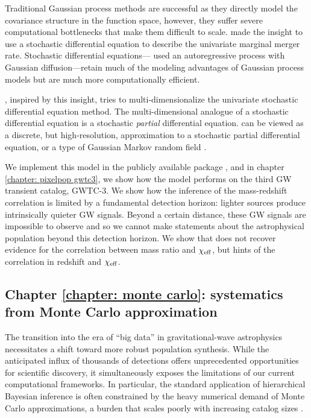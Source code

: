 \begin{refsection}
Traditional Gaussian process methods are successful as they directly model the covariance structure in the function space, however, they suffer severe computational bottlenecks that make them difficult to scale. \citet{Callister:2023tgi} made the insight to use a stochastic differential equation to describe the univariate marginal merger rate. Stochastic differential equations---\citet{Callister:2023tgi} used an autoregressive process with Gaussian diffusion---retain much of the modeling advantages of Gaussian process models but are much more computationally efficient. 

\PixelPop, inspired by this insight, tries to multi-dimensionalize the univariate stochastic differential equation method. The multi-dimensional analogue of a stochastic differential equation is a stochastic \textit{partial} differential equation. \PixelPop can be viewed as a discrete, but high-resolution, approximation to a stochastic partial differential equation, or a type of Gaussian Markov random field \citep{Besag:1974abc,lindgren_explicit_2011}. 

We implement this model in the publicly available package \PixelPop \cite{heinzel_pixelpop_2024}, and in chapter \ref{chapter: pixelpop gwtc3}, we show how the \PixelPop model performs on the third \ac{GW} transient catalog, GWTC-3. We show how the inference of the mass-redshift correlation is limited by a fundamental detection horizon: lighter sources produce intrinsically quieter \ac{GW} signals. Beyond a certain distance, these \ac{GW} signals are impossible to observe and so we cannot make statements about the astrophysical population beyond this detection horizon. We show that \PixelPop does not recover evidence for the correlation between mass ratio and $\chi_{\rm eff}$, but hints of the correlation in redshift and $\chi_{\rm eff}$. 



\subsection{Chapter \ref{chapter: monte carlo}: systematics from Monte Carlo approximation}

The transition into the era of ``big data'' in gravitational-wave astrophysics necessitates a shift toward more robust population synthesis. While the anticipated influx of thousands of detections offers unprecedented opportunities for scientific discovery, it simultaneously exposes the limitations of our current computational frameworks. In particular, the standard application of hierarchical Bayesian inference is often constrained by the heavy numerical demand of Monte Carlo approximations, a burden that scales poorly with increasing catalog sizes \citep{Essick:2022ojx, Talbot:2023pex}.


\end{refsection}
